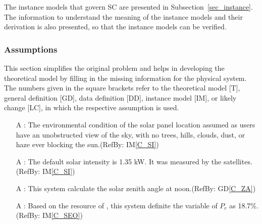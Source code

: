 \documentclass[12pt]{article}
\newcommand{\dref}[1]{GD\ref{#1}}
\newcounter{assumpnum} %
\newcommand{\iref}[1]{IM\ref{#1}}
\begin{document}
The instance models that govern SC are presented in
Subsection~\ref{sec_instance}.  The information to understand the meaning of the
instance models and their derivation is also presented, so that the instance
models can be verified.

\subsubsection{Assumptions} \label{sec_assumpt}

This section simplifies the original problem and helps in developing the
theoretical model by filling in the missing information for the physical
system. The numbers given in the square brackets refer to the theoretical model
[T], general definition [GD], data definition [DD], instance model [IM], or
likely change [LC], in which the respective assumption is used.

\begin{itemize}

\item[A\refstepcounter{assumpnum}\theassumpnum \label{a_spe}]: The environmental condition of the solar panel location assumed as users have an unobstructed view of the sky, with no trees, hills, clouds, dust, or haze ever blocking the sun.(RefBy: \iref{C_SI})\\

\item[A\refstepcounter{assumpnum}\theassumpnum \label{a_dsip}]: The default solar intensity is 1.35 kW. It was measured by the satellites.(RefBy: \iref{C_SI})\\

\item[A\refstepcounter{assumpnum}\theassumpnum \label{a_dsia}]: This system calculate the solar zenith angle at noon.(RefBy: \dref{C_ZA})\\

\item[A\refstepcounter{assumpnum}\theassumpnum \label{a_dp}]: Based
 on the resource of \cite{EMPA2011}, this system definite the variable of $P_r$ as 18.7\%.(RefBy: \iref{C_SEO})\\

\end{itemize}
\end{document}
